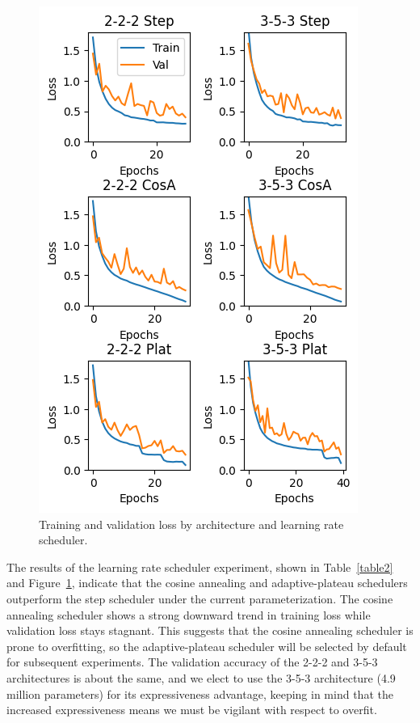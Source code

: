 \documentclass[letterpaper]{article} %
\begin{document}
\begin{figure}[t]
\centering
\includegraphics[width=0.98\columnwidth]{experiment-lrschedule-3x2}
\caption{Training and validation loss by architecture and learning rate scheduler.}
\label{fig3}
\end{figure}


The results of the learning rate scheduler experiment, shown in Table~\ref{table2} and Figure~\ref{fig3}, indicate that
the cosine annealing and adaptive-plateau schedulers outperform the step scheduler under the current
parameterization.
The cosine annealing scheduler shows a strong downward trend in training loss while validation loss
stays stagnant.
This suggests that the cosine annealing scheduler is prone to overfitting, so the
adaptive-plateau scheduler will be selected by default for subsequent experiments.
The validation accuracy of the 2-2-2 and 3-5-3 architectures is about the same,
and we elect to use the 3-5-3 architecture (4.9 million parameters) for its expressiveness
advantage, keeping in mind that the increased expressiveness means we must be vigilant
with respect to overfit.
\end{document}
